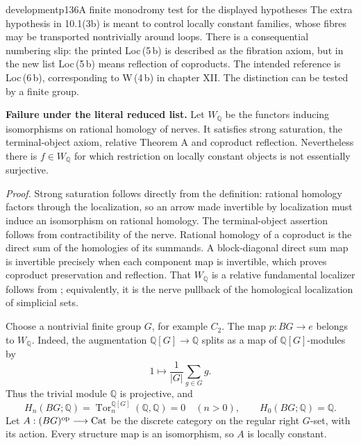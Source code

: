 \begin{dcomment}{development}{p136}{A finite monodromy test for the displayed hypotheses}
The extra hypothesis in 10.1(3b) is meant to control locally constant families, whose fibres may be transported nontrivially around loops. There is a consequential numbering slip: the printed Loc\,(5\,b) is described as the fibration axiom, but in the new list Loc\,(5\,b) means reflection of coproducts. The intended reference is Loc\,(6\,b), corresponding to W\,(4\,b) in chapter XII. The distinction can be tested by a finite group.

\textbf{Failure under the literal reduced list.}\ours
Let $W_{\mathbb Q}$ be the functors inducing isomorphisms on rational homology of nerves. It satisfies strong saturation, the terminal-object axiom, relative Theorem A and coproduct reflection. Nevertheless there is $f\in W_{\mathbb Q}$ for which restriction on locally constant objects is not essentially surjective.

\emph{Proof.} Strong saturation follows directly from the definition: rational homology factors through the localization, so an arrow made invertible by localization must induce an isomorphism on rational homology. The terminal-object assertion follows from contractibility of the nerve. Rational homology of a coproduct is the direct sum of the homologies of its summands. A block-diagonal direct sum map is invertible precisely when each component map is invertible, which proves coproduct preservation and reflection. That $W_{\mathbb Q}$ is a relative fundamental localizer follows from \citet[Corollary 9.4.3 and \S9.4.4]{Cisinski2006}; equivalently, it is the nerve pullback of the homological localization of simplicial sets.

Choose a nontrivial finite group $G$, for example $C_2$. The map $p:BG\longrightarrow e$ belongs to $W_{\mathbb Q}$. Indeed, the augmentation $\mathbb Q[G]\longrightarrow\mathbb Q$ splits as a map of $\mathbb Q[G]$-modules by
\[
 1\longmapsto\frac1{|G|}\sum_{g\in G}g.
\]
Thus the trivial module $\mathbb Q$ is projective, and
\[
 H_n(BG;\mathbb Q)=
 \operatorname{Tor}^{\mathbb Q[G]}_n(\mathbb Q,\mathbb Q)=0\quad(n>0),
 \qquad H_0(BG;\mathbb Q)=\mathbb Q.
\]
Let $A:(BG)^{\mathrm{op}}\longrightarrow\mathrm{Cat}$ be the discrete category on the regular right $G$-set, with its action. Every structure map is an isomorphism, so $A$ is locally constant.


\end{dcomment}

